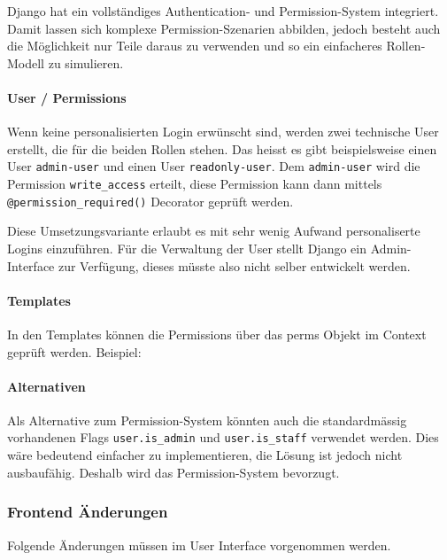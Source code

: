 Django hat ein vollständiges Authentication- und Permission-System integriert. Damit 
lassen sich komplexe Permission-Szenarien abbilden, jedoch besteht auch die Möglichkeit 
nur Teile daraus zu verwenden und so ein einfacheres Rollen-Modell zu simulieren.

\paragraph*{User / Permissions}

Wenn keine personalisierten Login erwünscht sind, werden zwei technische User
erstellt, die für die beiden Rollen stehen. Das heisst es gibt beispielsweise
einen User \texttt{admin-user} und einen User \texttt{readonly-user}. Dem
\texttt{admin-user} wird die Permission \texttt{write\_access} erteilt, diese
Permission kann dann mittels \texttt{@permission\_required()} Decorator geprüft
werden.

Diese Umsetzungsvariante erlaubt es mit sehr wenig Aufwand personaliserte Logins
einzuführen. Für die Verwaltung der User stellt Django ein Admin-Interface zur
Verfügung, dieses müsste also nicht selber entwickelt werden.

\paragraph*{Templates}

In den Templates können die Permissions über das perms Objekt im Context geprüft werden. 
Beispiel:


\paragraph*{Alternativen}

Als Alternative zum Permission-System könnten auch die standardmässig vorhandenen Flags 
\texttt{user.is\_admin} und \texttt{user.is\_staff} verwendet werden. Dies wäre bedeutend 
einfacher zu implementieren, die Lösung ist jedoch nicht ausbaufähig. Deshalb wird das 
Permission-System bevorzugt.


\subsubsection{Frontend Änderungen}
Folgende Änderungen müssen im User Interface vorgenommen werden.

